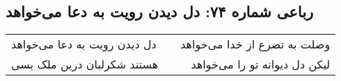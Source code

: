 \begin{center}
\section*{رباعی شماره ۷۴: دل دیدن رویت به دعا می‌خواهد}
\label{sec:074}
\begin{longtable}{l p{0.5cm} r}
دل دیدن رویت به دعا می‌خواهد
&&
وصلت به تضرع از خدا می‌خواهد
\\
هستند شکرلبان درین ملک بسی
&&
لیکن دل دیوانه تو را می‌خواهد
\\
\end{longtable}
\end{center}
